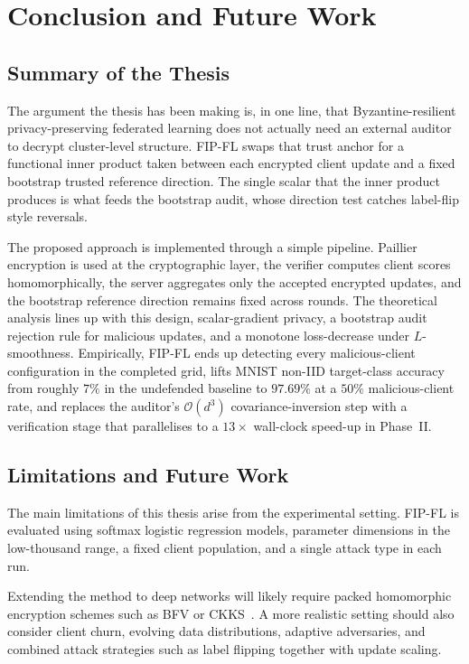 \chapter{Conclusion and Future Work}
\label{Conclusion:chap:chap9}
\graphicspath{{18.Chapter9/Images/}}
\raggedbottom

\section{Summary of the Thesis}
\label{sec:concl-summary}

The argument the thesis has been making is, in one line, that Byzantine-resilient privacy-preserving federated learning does not actually need an external auditor to decrypt cluster-level structure. FIP-FL swaps that trust anchor for a functional inner product taken between each encrypted client update and a fixed bootstrap trusted reference direction. The single scalar that the inner product produces is what feeds the bootstrap audit, whose direction test catches label-flip style reversals.

The proposed approach is implemented through a simple pipeline. Paillier encryption is used at the cryptographic layer, the verifier computes client scores homomorphically, the server aggregates only the accepted encrypted updates, and the bootstrap reference direction remains fixed across rounds. The theoretical analysis lines up with this design, scalar-gradient privacy, a bootstrap audit rejection rule for malicious updates, and a monotone loss-decrease under $L$-smoothness. Empirically, FIP-FL ends up detecting every malicious-client configuration in the completed grid, lifts MNIST non-IID target-class accuracy from roughly $7\%$ in the undefended baseline to $97.69\%$ at a $50\%$ malicious-client rate, and replaces the auditor's $\mathcal{O}(d^3)$ covariance-inversion step with a verification stage that parallelises to a $13\times$ wall-clock speed-up in Phase~II.

\section{Limitations and Future Work}
\label{sec:concl-limits-future}

The main limitations of this thesis arise from the experimental setting. FIP-FL is evaluated using softmax logistic regression models, parameter dimensions in the low-thousand range, a fixed client population, and a single attack type in each run.

Extending the method to deep networks will likely require packed homomorphic encryption schemes such as BFV or CKKS~\cite{cheon2017homomorphic}. A more realistic setting should also consider client churn, evolving data distributions, adaptive adversaries, and combined attack strategies such as label flipping together with update scaling.

